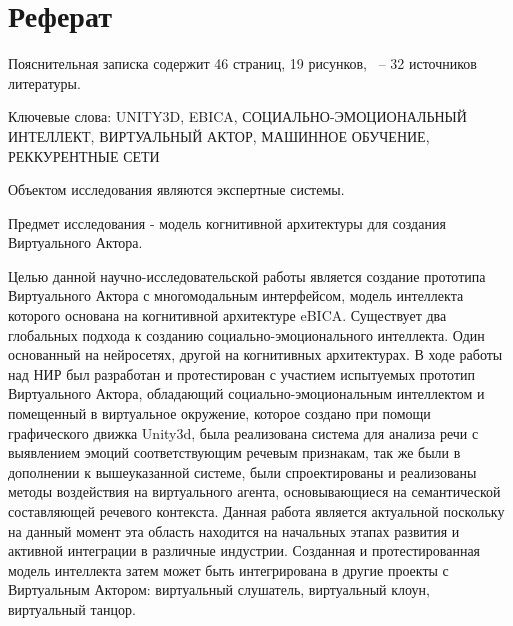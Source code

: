 \chapter*{Реферат}
\thispagestyle{plain}


Пояснительная записка содержит 46 страниц, 19 рисунков, ~-- 32 источников литературы.

Ключевые слова: UNITY3D, EBICA, СОЦИАЛЬНО-ЭМОЦИОНАЛЬНЫЙ ИНТЕЛЛЕКТ, ВИРТУАЛЬНЫЙ АКТОР, МАШИННОЕ ОБУЧЕНИЕ, РЕККУРЕНТНЫЕ СЕТИ 

Объектом исследования являются экспертные системы.

Предмет исследования - модель когнитивной архитектуры для создания Виртуального Актора.

Целью данной научно-исследовательской работы является создание прототипа Виртуального Актора с многомодальным интерфейсом, 
модель интеллекта которого основана на когнитивной архитектуре eBICA.
Существует два глобальных подхода к созданию социально-эмоционального интеллекта. 
Один основанный на нейросетях, другой на когнитивных архитектурах.
В ходе работы над НИР был разработан и протестирован с участием испытуемых прототип Виртуального Актора, 
обладающий социально-эмоциональным интеллектом и помещенный в виртуальное окружение, которое создано при помощи графического движка Unity3d, 
была реализована система для анализа речи с выявлением эмоций соответствующим речевым признакам, так же были
в дополнении к вышеуказанной системе, были спроектированы и реализованы методы 
воздействия на виртуального агента, основывающиеся на семантической составляющей речевого контекста.
Данная работа является актуальной поскольку на данный момент эта область находится на начальных этапах 
развития и активной интеграции в различные индустрии.
Созданная и протестированная модель интеллекта затем может быть интегрирована в другие проекты с 
Виртуальным Актором: виртуальный слушатель, виртуальный клоун, виртуальный танцор. 